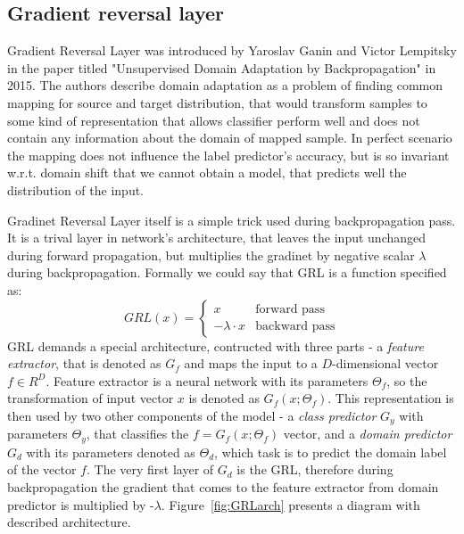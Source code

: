 \documentclass{article}
\begin{document}
\subsection{Gradient reversal layer}
Gradient Reversal Layer was introduced by Yaroslav Ganin and Victor Lempitsky in the paper titled "Unsupervised Domain Adaptation by Backpropagation" in 2015. The authors describe domain adaptation as a problem of finding common mapping for source and target distribution, that would transform samples to some kind of representation that allows classifier perform well and does not contain any information about the domain of mapped sample. In perfect scenario the mapping does not influence the label predictor's accuracy, but is so invariant w.r.t. domain shift that we cannot obtain a model, that predicts well the distribution of the input.
\par
Gradinet Reversal Layer itself is a simple trick used during backpropagation pass. It is a trival layer in network's architecture, that leaves the input unchanged during forward propagation, but multiplies the gradinet by negative scalar $\lambda$ during backpropagation. Formally we could say that GRL is a function specified as:
\begin{equation*}
GRL(x) = \begin{cases}
x &\text{forward pass}\\
-\lambda \cdot x &\text{backward pass}
\end{cases}
\end{equation*}
GRL demands a special architecture, contructed with three parts - a \textit{feature extractor}, that is denoted as $G_{f}$ and maps the input to a $D$-dimensional vector $f \in R^{D}$. Feature extractor is a neural network with its parameters $\Theta_{f}$, so the transformation of input vector $x$ is denoted as $G_{f}(x;\Theta_{f})$. This representation is then used by two other components of the model - a \textit{class predictor} $G_{y}$ with parameters $\Theta_{y}$, that classifies the $f = G_{f}(x;\Theta_{f})$ vector, 
and a \textit{domain predictor} $G_{d}$ with its parameters denoted as $\Theta_{d}$, which task is to predict the domain label of the vector $f$. The very first layer of $G_{d}$ is the GRL, therefore during backpropagation the gradient that comes to the feature extractor from domain predictor is multiplied by -$\lambda$. Figure~\ref{fig:GRLarch} presents a diagram with described architecture.
\par
\end{document}
